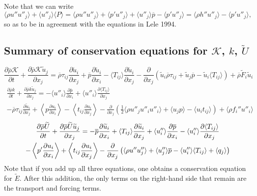 \documentclass[oneside,a4paper,11pt]{report}
\newcommand{\rhoavg}{\overline{\rho}}
\newcommand{\pavg}{\overline{p}}
\newcommand{\pfluc}{p'}
\newcommand{\rs}{\tau}          %
\newcommand{\uifluc}{u_i}
\newcommand{\ujfluc}{u_j}
\newcommand{\uavgf}{\widetilde{u}}
\newcommand{\Eavgf}{\widetilde{E}}
\newcommand{\Uavgf}{\widetilde{U}}
\newcommand{\uflucf}{u''}
\begin{document}
Note that we can write
\begin{equation}
    \langle \rho u'' \uflucf_j \rangle + \langle \uflucf_j \rangle \langle P \rangle = \langle \rho u'' \uflucf_j \rangle + \langle \pfluc \uflucf_j \rangle + \langle \uflucf_j \rangle \pavg - \langle \pfluc \uflucf_j \rangle = \langle \rho h'' \uflucf_j \rangle - \langle \pfluc \uflucf_j \rangle,
\end{equation}
so as to be in agreement with the equations in Lele 1994.

\subsection{Summary of conservation equations for $\mathcal{K}$, $k$, $\Uavgf$}
\begin{equation}
\frac{ \partial \rhoavg \mathcal{K} }{ \partial t} + \frac{ \partial \rhoavg \mathcal{K} \uavgf_j }{ \partial x_j} = \rhoavg \rs_{ij} \frac{ \partial \uavgf_i }{ \partial x_j } + \pavg \frac{ \partial \uavgf_i }{ \partial x_i } - \langle T_{ij} \rangle \frac{ \partial \uavgf_i }{ \partial x_j } - \frac{\partial}{\partial x_j} \left ( \uavgf_i \rhoavg \rs_{ij} + \uavgf_j \pavg - \uavgf_i \langle T_{ij} \rangle \right ) + \rhoavg \tilde{F}_i \uavgf_i
\end{equation}
\begin{multline}
\frac{ \partial \rhoavg k }{ \partial t}  + \frac{ \partial \rhoavg k \uavgf_j }{ \partial x_j } = - \langle \uflucf_i \rangle \frac{ \partial \pavg }{ \partial x_i } + \langle \uflucf_i \rangle \frac{ \partial \langle T_{ij} \rangle }{ \partial x_j } \\
- \rhoavg \rs_{ij} \frac{ \partial \uavgf_i }{ \partial x_j}  + \left < p \frac{ \partial \uifluc } { \partial x_i } \right > - \left <  t_{ij} \frac{ \partial u_i }{ \partial x_j } \right > - \frac{\partial}{ \partial x_j} \left ( \frac{1}{2} \langle \rho \uflucf_j \uflucf_i \uflucf_i \rangle + \langle \ujfluc p \rangle  - \langle \uifluc t_{ij} \rangle \right ) + \langle \rho f_i'' \uflucf_i \rangle
\end{multline}
\begin{multline}
    \frac{\partial \rhoavg \Uavgf}{\partial t} + \frac{\partial \rhoavg \Uavgf \uavgf_j}{\partial x_j} = -\pavg \frac{\partial \uavgf_i}{\partial x_i} + \langle T_{ij} \rangle \frac{\partial \uavgf_i}{\partial x_j} +\langle \uflucf_i \rangle \frac{\partial \pavg}{\partial x_i} - \langle \uflucf_i \rangle \frac{\partial \langle T_{ij} \rangle}{\partial x_j} \\
    - \left < \pfluc \frac{\partial \uifluc}{\partial x_i} \right > + \left < t_{ij} \frac{\partial \uifluc}{\partial x_j} \right > - \frac{\partial}{\partial x_j} \left ( \langle \rho u'' \uflucf_j \rangle +  \langle \uflucf_j \rangle \pavg - \langle \uflucf_i \rangle \langle T_{ij} \rangle + \lbra q_j \rbra \right)
\end{multline}
Note that if you add up all three equations, one obtains a conservation equation for $\Eavgf$. After this addition, the only terms on the right-hand side that remain are the transport and forcing terms.
\end{document}
